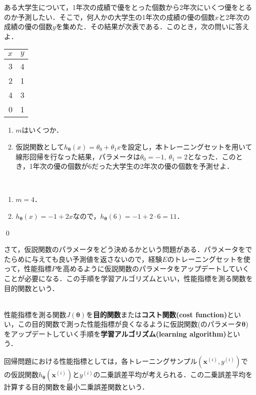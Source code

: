\begin{qu}
ある大学生について，1年次の成績で優をとった個数から2年次にいくつ優をとるのか予測したい．そこで，何人かの大学生の1年次の成績の優の個数$x$と2年次の成績の優の個数$y$を集めた．その結果が次表である．このとき，次の問いに答えよ．
\begin{table}[H]
\centering
\begin{tabular}{rr}
\hline
$x$    & $y$   \\ \hline
3 & 4 \\
2 & 1 \\
4 & 3 \\
0  & 1 \\ \hline
\end{tabular}
\end{table}
\begin{enumerate}
\item $m$はいくつか．
\item 仮説関数として$h_{{\bm \theta}}(x)=\theta_0+\theta_1 x$を設定し，本トレーニングセットを用いて線形回帰を行なった結果，パラメータは$\theta_0=-1,~\theta_1=2$となった．このとき，1年次の優の個数が6だった大学生の2年次の優の個数を予測せよ．
\end{enumerate}
\end{qu}
\begin{ans}　
\begin{enumerate}
\item $m=4$．
\item $h_{{\bm \theta}}(x)=-1+2x$なので，$h_{{\bm \theta}}(6)=-1+2\cdot 6=11$．
\end{enumerate}
\qed	
\end{ans}

さて，仮説関数のパラメータをどう決めるかという問題がある．パラメータをでたらめに与えても良い予測値を返さないので，経験$E$のトレーニングセットを使って，性能指標$P$を高めるように仮説関数のパラメータをアップデートしていくことが必要になる．この手順を学習アルゴリズムといい，性能指標を測る関数を目的関数という．

\begin{defi}
　\\
性能指標を測る関数$J({\bm \theta})$を{\bf 目的関数}または{\bf コスト関数(cost function)}といい，この目的関数で測った性能指標が良くなるように仮説関数(のパラメータ${\bm \theta}$)をアップデートしていく手順を{\bf 学習アルゴリズム(learning algorithm)}という．
\end{defi}

回帰問題における性能指標としては，各トレーニングサンプル$({\bm x}^{(i)},y^{(i)})$での仮説関数$h_{{\bm \theta}}({\bm x}^{(i)})$と$y^{(i)}$の二乗誤差平均が考えられる．この二乗誤差平均を計算する目的関数を最小二乗誤差関数という．

